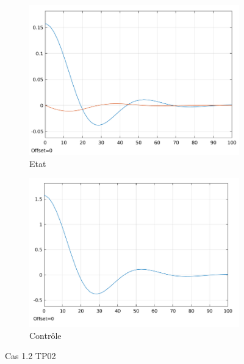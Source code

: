 \documentclass[a4paper]{article}
\begin{document}
                        \begin{figure}[h!]
                                \centering
                                \begin{subfigure}[b]{0.45\textwidth}
                                        \includegraphics[width=\textwidth]{images/courbe_cas_1_2_TP02.png}
                                        \caption{Etat}
                                        \label{fig_cas_1.2_TP02_etats}
                                \end{subfigure}
                                \hspace{30pt}
                                \begin{subfigure}[b]{0.45\textwidth}
                                        \includegraphics[width=\textwidth]{images/controle_cas_1_2_TP02.png}
                                        \caption{Contrôle}
                                        \label{fig_cas_1.2_TP02_controle}
                                \end{subfigure}
                                \caption{Cas 1.2 TP02}
                                \label{fig_cas_1.2_TP02}
                        \end{figure}
\end{document}
